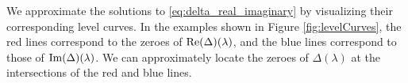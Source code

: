 \documentclass[11pt, oneside, a4paper]{article}
\begin{document}

We approximate the solutions to \eqref{eq:delta_real_imaginary} by visualizing their corresponding level curves. In the examples shown in Figure \ref{fig:levelCurves}, the red lines correspond to the zeroes of $\mathrm{Re}(\Delta)(\lambda)$, and the blue lines correspond to those of $\mathrm{Im}(\Delta)(\lambda)$. We can approximately locate the zeroes of $\Delta(\lambda)$ at the intersections of the red and blue lines. 
\end{document}
